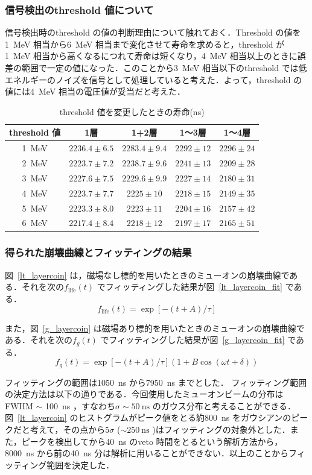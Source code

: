 \subsubsection{信号検出のthreshold 値について}
信号検出時のthreshold の値の判断理由について触れておく．Threshold の値を1~MeV 相当から6~MeV 相当まで変化させて寿命を求めると，threshold が1~MeV 相当から高くなるにつれて寿命は短くなり，4~MeV 相当以上のときに誤差の範囲で一定の値になった．このことから3~MeV 相当以下のthreshold では低エネルギーのノイズを信号として処理していると考えた．よって，threshold の値には4~MeV 相当の電圧値が妥当だと考えた．

\begin{table}[h]
 \caption{threshold 値を変更したときの寿命(ns)}
 \label{PS_decide_threshold}
 \centering
 \begin{tabular}{ccccc}\toprule
  threshold 値 & 1層 & 1+2層 & 1〜3層 & 1〜4層 \\ \hline
  1~MeV& $2236.4\pm 6.5$ & $2283.4\pm 9.4$ & $2292\pm 12$ & $2296\pm 24$ \\
  2~MeV& $2223.7\pm 7.2$ & $2238.7\pm 9.6$ & $2241\pm 13$ & $2209\pm 28$ \\
  3~MeV& $2227.6\pm 7.5$ & $2229.6\pm 9.9$ & $2227\pm 14$ & $2180\pm 31$ \\
  4~MeV& $2223.7\pm 7.7$ & $2225  \pm 10 $ & $2218\pm 15$ & $2149\pm 35$ \\
  5~MeV& $2223.3\pm 8.0$ & $2223  \pm 11 $ & $2204\pm 16$ & $2157\pm 42$ \\
  6~MeV& $2217.4\pm 8.4$ & $2218  \pm 12 $ & $2197\pm 17$ & $2165\pm 51$ \\ \bottomrule
 \end{tabular}

\end{table}

\subsubsection{得られた崩壊曲線とフィッティングの結果}
図~\ref{lt_layercoin} は，磁場なし標的を用いたときのミューオンの崩壊曲線である．それを次の$f_{\mathrm{life}}(t)$ でフィッティングした結果が図~\ref{lt_layercoin_fit} である．
\[f_{\mathrm{life}}(t) = \exp[-(t+A)/\tau]\]

また，図~\ref{g_layercoin} は磁場あり標的を用いたときのミューオンの崩壊曲線である．それを次の$f_{g}(t)$ でフィッティングした結果が図~\ref{g_layercoin_fit} である．
\[f_{g}(t) = \exp[-(t+A)/\tau](1+B\cos(\omega t + \delta))\]

  
フィッティングの範囲は1050~ns から7950~ns までとした． フィッティング範囲の決定方法は以下の通りである．今回使用したミューオンビームの分布はFWHM $\sim$ 100~ns ，すなわち$\sigma \sim 50~\mathrm{ns}$ のガウス分布と考えることができる．図~\ref{lt_layercoin} のヒストグラムがピーク値をとる約800~ns をガウシアンのピークだと考えて，その点から$5\sigma$ ($\sim 250~\mathrm{ns}$ )はフィッティングの対象外とした．また，ピークを検出してから40~ns のveto 時間をとるという解析方法から，8000~ns から前の40~ns 分は解析に用いることができない．以上のことからフィッティング範囲を決定した．
  
